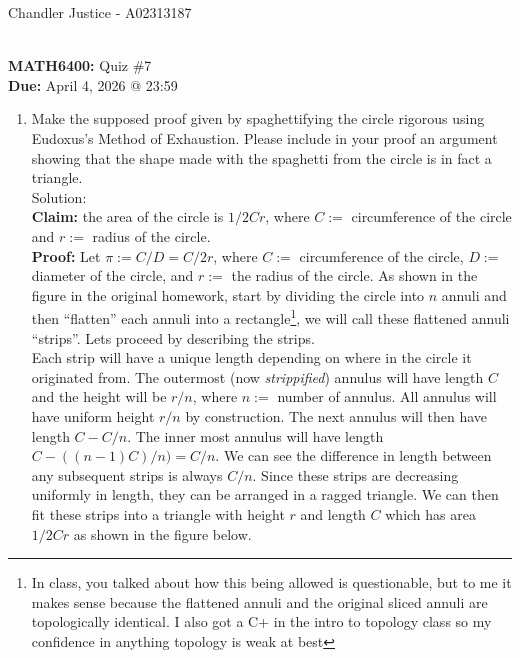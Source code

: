 \documentclass[10pt]{article}
\newcommand{\solution}{\color{blue} Solution: \color{black}}
\begin{document}
\begin{flushright}
Chandler Justice - A02313187
\end{flushright}
\noindent \underline{\hspace{3in}}\\
\textbf{MATH6400:} Quiz \#7\\
\textbf{Due:} April 4, 2026 @ 23:59\\

	
	\begin{enumerate}
		
		\item Make the supposed proof given by spaghettifying the circle rigorous using Eudoxus's Method of Exhaustion.  
		Please include in your proof an argument showing that the shape made with the spaghetti from the circle is in fact a triangle.\\

        \solution\\
        \textbf{Claim:} the area of the circle is $1/2 C r$, where $C :=$ circumference of the circle and $r := $ radius of the circle.\\

        \textbf{Proof:} Let $\pi := C/D = C/2r$, where $C :=$ circumference of the circle, $D :=$ diameter of the circle, and $r :=$ the radius of the circle. As shown in the figure in the original homework, start by dividing the circle into $n$ annuli and then ``flatten'' each annuli into a rectangle\footnote{In class, you talked about how this being allowed is questionable, but to me it makes sense because the flattened annuli and the original sliced annuli are topologically identical. I also got a C+ in the intro to topology class so my confidence in anything topology is weak at best}, we will call these flattened annuli ``strips''. Lets proceed by describing the strips.\\

        Each strip will have a unique length depending on where in the circle it originated from. The outermost (now \textit{strippified}) annulus will have length $C$ and the height will be $r/n$, where $n :=$ number of annulus. All annulus will have uniform height $r/n$ by construction. The next annulus will then have length $C - C/n$. The inner most annulus will have length $C - ((n-1)C)/n) = C/n$. We can see the difference in length between any subsequent strips is always $C/n$. Since these strips are decreasing uniformly in length, they can be arranged in a ragged triangle. We can then fit these strips into a triangle with height $r$ and length $C$ which has area $1/2Cr$ as shown in the figure below.


\end{enumerate}
\end{document}
